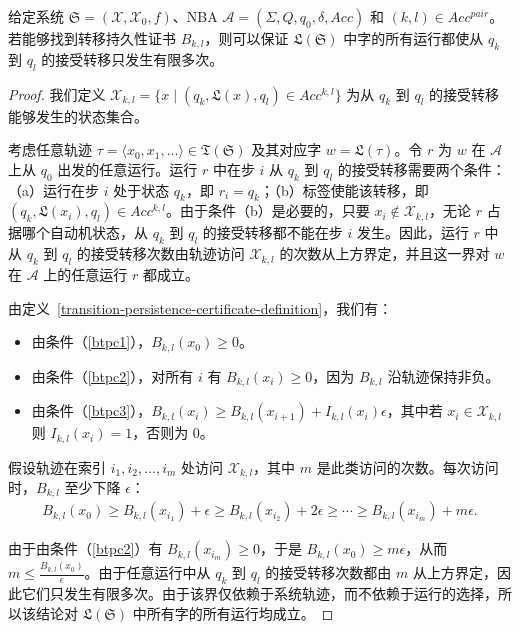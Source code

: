 \begin{lemma}
  给定系统 $\mathfrak{S}=(\mathcal{X}, \mathcal{X}_0, f)$、NBA $\mathcal{A} = (\Sigma, Q, q_0, \delta, Acc)$ 和 $(k, l) \in Acc^{pair}$。若能够找到转移持久性证书 $B_{k, l}$，则可以保证 $\mathfrak{L}(\mathfrak{S})$ 中字的所有运行都使从 $q_k$ 到 $q_l$ 的接受转移只发生有限多次。
\end{lemma}

\begin{proof}
我们定义 $\mathcal{X}_{k, l}=\{x \mid (q_k, \mathfrak{L}(x), q_l) \in Acc^{k,l}\}$ 为从 $q_k$ 到 $q_l$ 的接受转移能够发生的状态集合。

考虑任意轨迹 $\tau = \langle x_0, x_1, \dots \rangle \in \mathfrak{T}(\mathfrak{S})$ 及其对应字 $w = \mathfrak{L}(\tau)$。令 $r$ 为 $w$ 在 $\mathcal{A}$ 上从 $q_0$ 出发的任意运行。运行 $r$ 中在步 $i$ 从 $q_k$ 到 $q_l$ 的接受转移需要两个条件：（a）运行在步 $i$ 处于状态 $q_k$，即 $r_i = q_k$；（b）标签使能该转移，即 $(q_k, \mathfrak{L}(x_i), q_l) \in Acc^{k,l}$。由于条件（b）是必要的，只要 $x_i \notin \mathcal{X}_{k,l}$，无论 $r$ 占据哪个自动机状态，从 $q_k$ 到 $q_l$ 的接受转移都不能在步 $i$ 发生。因此，运行 $r$ 中从 $q_k$ 到 $q_l$ 的接受转移次数由轨迹访问 $\mathcal{X}_{k,l}$ 的次数从上方界定，并且这一界对 $w$ 在 $\mathcal{A}$ 上的任意运行 $r$ 都成立。

由定义~\ref{transition-persistence-certificate-definition}，我们有：
\begin{itemize}
  \item 由条件（\ref{btpc1}），$B_{k,l}(x_0) \geq 0$。
  \item 由条件（\ref{btpc2}），对所有 $i$ 有 $B_{k,l}(x_i) \geq 0$，因为 $B_{k,l}$ 沿轨迹保持非负。
  \item 由条件（\ref{btpc3}），$B_{k,l}(x_i) \geq B_{k,l}(x_{i+1}) + I_{k,l}(x_i)\epsilon$，其中若 $x_i \in \mathcal{X}_{k,l}$ 则 $I_{k,l}(x_i) = 1$，否则为 $0$。
\end{itemize}

假设轨迹在索引 $i_1, i_2, \dots, i_m$ 处访问 $\mathcal{X}_{k,l}$，其中 $m$ 是此类访问的次数。每次访问时，$B_{k,l}$ 至少下降 $\epsilon$：
\begin{align}
B_{k,l}(x_0) \geq B_{k,l}(x_{i_1}) + \epsilon \geq B_{k,l}(x_{i_2}) + 2\epsilon \geq \cdots \geq B_{k,l}(x_{i_m}) + m\epsilon.
\end{align}

由于由条件（\ref{btpc2}）有 $B_{k,l}(x_{i_m}) \geq 0$，于是 $B_{k,l}(x_0) \geq m\epsilon$，从而 $m \leq \frac{B_{k,l}(x_0)}{\epsilon}$。由于任意运行中从 $q_k$ 到 $q_l$ 的接受转移次数都由 $m$ 从上方界定，因此它们只发生有限多次。由于该界仅依赖于系统轨迹，而不依赖于运行的选择，所以该结论对 $\mathfrak{L}(\mathfrak{S})$ 中所有字的所有运行均成立。
\end{proof}


